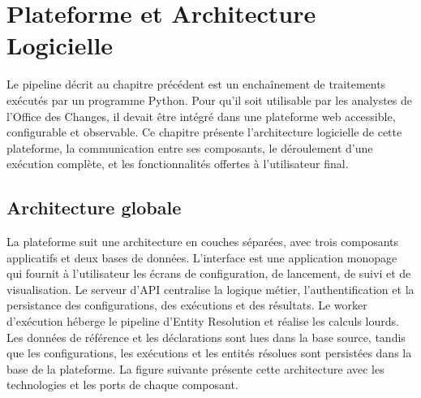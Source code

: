 \chapter{Plateforme et Architecture Logicielle}

Le pipeline décrit au chapitre précédent est un enchaînement de traitements exécutés par un programme Python. Pour qu'il soit utilisable par les analystes de l'Office des Changes, il devait être intégré dans une plateforme web accessible, configurable et observable. Ce chapitre présente l'architecture logicielle de cette plateforme, la communication entre ses composants, le déroulement d'une exécution complète, et les fonctionnalités offertes à l'utilisateur final.

\section{Architecture globale}

La plateforme suit une architecture en couches séparées, avec trois composants applicatifs et deux bases de données. L'interface est une application monopage qui fournit à l'utilisateur les écrans de configuration, de lancement, de suivi et de visualisation. Le serveur d'API centralise la logique métier, l'authentification et la persistance des configurations, des exécutions et des résultats. Le worker d'exécution héberge le pipeline d'Entity Resolution et réalise les calculs lourds. Les données de référence et les déclarations sont lues dans la base source, tandis que les configurations, les exécutions et les entités résolues sont persistées dans la base de la plateforme. La figure suivante présente cette architecture avec les technologies et les ports de chaque composant.

